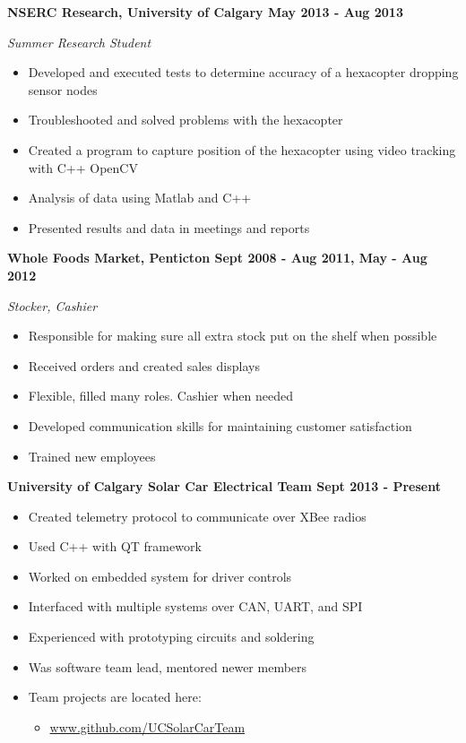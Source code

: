 \documentclass[12pt]{article}
\begin{document}
\noindent \centerline{ \bf NSERC Research, University of Calgary \hfill May 2013 - Aug 2013}
\indent \emph{ Summer Research Student }
\begin{itemize}
  \item Developed and executed tests to determine accuracy of a hexacopter dropping sensor nodes
  \item Troubleshooted and solved problems with the hexacopter
  \item Created a program to capture position of the hexacopter using video tracking with C++ OpenCV
  \item Analysis of data using Matlab and C++
  \item Presented results and data in meetings and reports
\end{itemize}

\noindent \centerline{ \bf Whole Foods Market, Penticton \hfill Sept 2008 - Aug 2011, May - Aug 2012}
\indent \emph{Stocker, Cashier}
\begin{itemize}
  \item Responsible for making sure all extra stock put on the shelf when possible
  \item Received orders and created sales displays
  \item Flexible, filled many roles. Cashier when needed
  \item Developed communication skills for maintaining customer satisfaction
  \item Trained new employees
\end{itemize}

\bigskip
{}
\bigskip

\noindent \centerline{\bf University of Calgary Solar Car Electrical Team \hfill Sept 2013 - Present}
\begin{itemize}
  \item Created telemetry protocol to communicate over XBee radios
  \item Used C++ with QT framework
  \item Worked on embedded system for driver controls
  \item Interfaced with multiple systems over CAN, UART, and SPI
  \item Experienced with prototyping circuits and soldering
  \item Was software team lead, mentored newer members
  \item Team projects are located here:
\begin{itemize}
  \item \url{www.github.com/UCSolarCarTeam}
\end{itemize}
\end{itemize}
\end{document}
